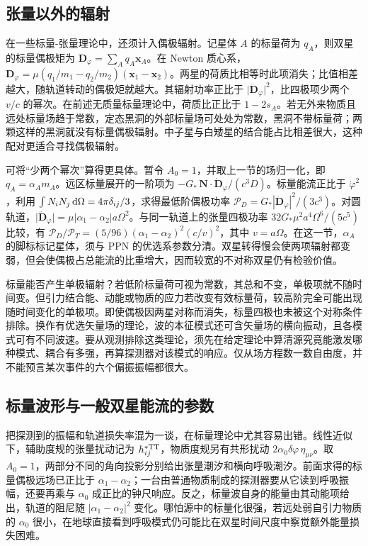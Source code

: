 \subsection{张量以外的辐射}

在一些标量-张量理论中，还须计入偶极辐射。记星体 $A$ 的标量荷为 $q_A$，则双星的标量偶极矩为 $\bm D_\varphi=\sum_A q_A\bm x_A$。在 Newton 质心系，$\bm D_\varphi=\mu(q_1/m_1-q_2/m_2)(\bm x_1-\bm x_2)$。两星的荷质比相等时此项消失；比值相差越大，随轨道转动的偶极矩就越大。其辐射功率正比于 $\lvert\ddot{\bm D}_\varphi\rvert^2$，比四极项少两个 $v/c$ 的幂次。在前述无质量标量理论中，荷质比正比于 $1-2s_A$。若无外来物质且远处标量场趋于常数，定态黑洞的外部标量场可处处为常数，黑洞不带标量荷；两颗这样的黑洞就没有标量偶极辐射。中子星与白矮星的结合能占比相差很大，这种配对更适合寻找偶极辐射。

可将“少两个幂次”算得更具体。暂令 $A_0=1$，并取上一节的场归一化，即 $q_A=\alpha_A m_A$。远区标量展开的一阶项为 $-G_*\,\bm N\cdot\dot{\bm D}_\varphi/(c^3D)$。标量能流正比于 $\dot\varphi^2$，利用 $\int N_iN_j\,\dd\Omega=4\pi\delta_{ij}/3$，求得最低阶偶极功率 $\mathcal P_D=G_*|\ddot{\bm D}_\varphi|^2/(3c^3)$。对圆轨道，$\lvert\ddot{\bm D}_\varphi\rvert=\mu|\alpha_1-\alpha_2|a\Omega^2$。与同一轨道上的张量四极功率 $32G_*\mu^2a^4\Omega^6/(5c^5)$ 比较，有 $\mathcal P_D/\mathcal P_T=(5/96)(\alpha_1-\alpha_2)^2(c/v)^2$，其中 $v=a\Omega$。在这一节，$\alpha_A$ 的脚标标记星体，须与 PPN 的优选系参数分清。双星转得慢会使两项辐射都变弱，但会使偶极占总能流的比重增大，因而较宽的不对称双星仍有检验价值。

标量能否产生单极辐射？若低阶标量荷可视为常数，其总和不变，单极项就不随时间变。但引力结合能、动能或物质的应力若改变有效标量荷，较高阶完全可能出现随时间变化的单极项。即使偶极因两星对称而消失，标量四极也未被这个对称条件排除。换作有优选矢量场的理论，波的本征模式还可含矢量场的横向振动，且各模式可有不同波速。要从观测排除这类理论，须先在给定理论中算清源究竟能激发哪种模式、耦合有多强，再算探测器对该模式的响应。仅从场方程数一数自由度，并不能预言某次事件的六个偏振振幅都很大。

\subsection{标量波形与一般双星能流的参数}

把探测到的振幅和轨道损失率混为一谈，在标量理论中尤其容易出错。线性近似下，辅助度规的张量扰动记为 $h^{*{\rm TT}}_{ij}$，物质度规另有共形扰动 $2\alpha_0\delta\varphi\,\eta_{\mu\nu}$。取 $A_0=1$，两部分不同的角向投影分别给出张量潮汐和横向呼吸潮汐。前面求得的标量偶极远场已正比于 $\alpha_1-\alpha_2$；一台由普通物质制成的探测器要从它读到呼吸振幅，还要再乘与 $\alpha_0$ 成正比的钟尺响应。反之，标量波自身的能量由其动能项给出，轨道的阻尼随 $|\alpha_1-\alpha_2|^2$ 变化。哪怕源中的标量化很强，若远处弱自引力物质的 $\alpha_0$ 很小，在地球直接看到呼吸模式仍可能比在双星时间尺度中察觉额外能量损失困难。

